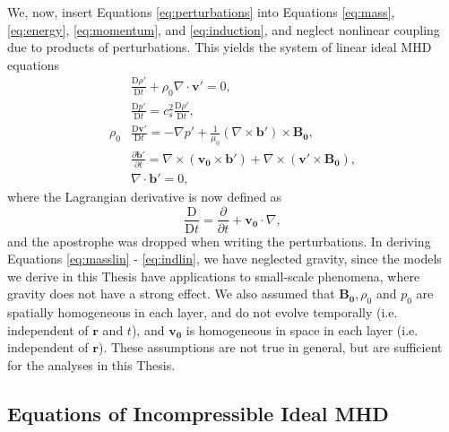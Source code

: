 We, now, insert Equations \eqref{eq:perturbations} into Equations \eqref{eq:mass}, \eqref{eq:energy}, \eqref{eq:momentum}, and \eqref{eq:induction}, and neglect nonlinear coupling due to products of perturbations.
This yields the system of linear ideal MHD equations
%
\begin{align}
\label{eq:masslin}
& \frac{\mathrm{D} \rho'}{\mathrm{D} t}
+ \rho_0 \nabla \cdot \mathbf{v'}
= 0,
\\[0.2cm]
\label{eq:enerlin}
& \frac{\mathrm{D} p'}{\mathrm{D} t}
= c_s^2 \frac{\mathrm{D} \rho'}{\mathrm{D} t},
\\[0.2cm]
\label{eq:momlin}
\rho_0 & \frac{\mathrm{D} \mathbf v'}{\mathrm{D} t}
= - \nabla p'
+ \frac{1}{\mu_0} (\nabla \times \mathbf{b'}) \times \mathbf{B_0},
\\[0.2cm]
\label{eq:indlin}
& \frac{\partial \mathbf{b'}}{\partial t}
= \nabla \times (\mathbf{v_0} \times \mathbf{b'})
+ \nabla \times (\mathbf{v'} \times \mathbf{B_0}),
\\[0.2cm]
\nonumber
& \nabla \cdot \mathbf{b}' = 0,
\end{align}
%
where the Lagrangian derivative is now defined as
%
\begin{equation}
\label{eq:lagder2}
\frac{\mathrm{D}}{\mathrm{D} t}
= \frac{\partial}{\partial t}
+ \mathbf{v_0} \cdot \nabla,
\end{equation}
%
and the apostrophe was dropped when writing the perturbations.
In deriving Equations \eqref{eq:masslin} - \eqref{eq:indlin}, we have neglected gravity, since the models we derive in this Thesis have applications to small-scale phenomena, where gravity does not have a strong effect.
We also assumed that $\mathbf{B_0}, \rho_0$ and $p_0$ are spatially homogeneous in each layer, and do not evolve temporally (i.e. independent of $\mathbf{r}$ and $t$), and $\mathbf{v_0}$ is homogeneous in space in each layer (i.e. independent of $\mathbf{r}$).
These assumptions are not true in general, but are sufficient for the analyses in this Thesis.

\subsection{Equations of Incompressible Ideal MHD}
\label{subsec:inc-mhd}

